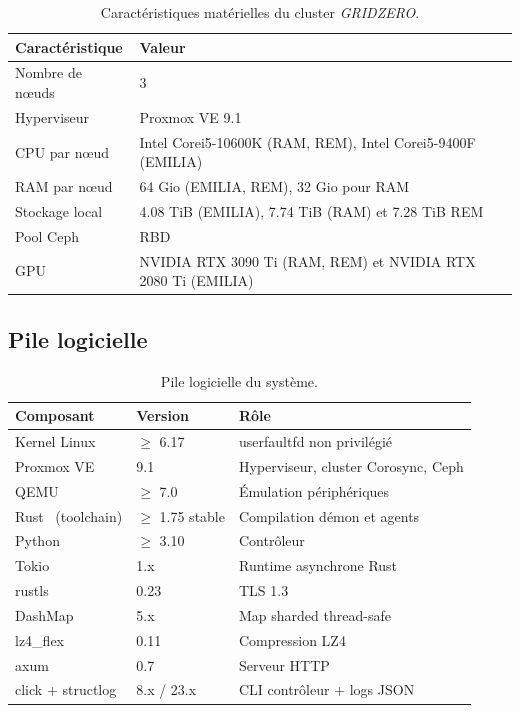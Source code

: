 \begin{table}[H]
\centering
\small
\caption{Caractéristiques matérielles du cluster \emph{GRIDZERO}.}
\begin{tabular}{lp{9.5cm}}
\toprule
\textbf{Caractéristique} & \textbf{Valeur} \\
\midrule
Nombre de nœuds          & 3 \\
Hyperviseur              & Proxmox VE 9.1\\
CPU par nœud             & Intel Corei5-10600K (RAM, REM), Intel Corei5-9400F (EMILIA) \\
RAM par nœud             & 64 Gio (EMILIA, REM), 32 Gio pour RAM \\
Stockage local           & 4.08 TiB (EMILIA), 7.74 TiB (RAM) et 7.28 TiB REM \\
Pool Ceph                & RBD \\
GPU                      & NVIDIA RTX 3090 Ti (RAM, REM) et NVIDIA RTX 2080 Ti (EMILIA)\\
\bottomrule
\end{tabular}
\label{tab:gridzero}
\end{table}

\subsection{Pile logicielle}

\begin{table}[H]
\centering
\small
\caption{Pile logicielle du système.}
\begin{tabular}{lll}
\toprule
\textbf{Composant} & \textbf{Version} & \textbf{Rôle} \\
\midrule
Kernel Linux           & $\ge$ 6.17           & userfaultfd non privilégié \\
Proxmox VE             & 9.1            & Hyperviseur, cluster Corosync, Ceph \\
QEMU                   & $\ge$ 7.0            & Émulation périphériques \\
Rust~\cite{rust_lang} (toolchain) & $\ge$ 1.75 stable    & Compilation démon et agents \\
Python                 & $\ge$ 3.10           & Contrôleur \\
Tokio~\cite{tokio_doc} & 1.x                  & Runtime asynchrone Rust \\
rustls                 & 0.23                 & TLS 1.3 \\
DashMap~\cite{dashmap_crate} & 5.x                  & Map sharded thread-safe \\
lz4\_flex~\cite{lz4_compression} & 0.11                 & Compression LZ4 \\
axum                   & 0.7                  & Serveur HTTP \\
click + structlog      & 8.x / 23.x           & CLI contrôleur + logs JSON \\
\bottomrule
\end{tabular}

\label{tab:stack}
\end{table}

